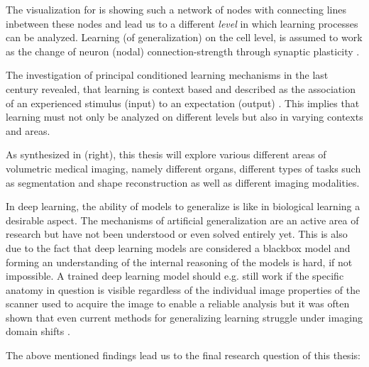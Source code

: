     The visualization for  is showing such a network of nodes with connecting lines inbetween these nodes and lead us to a different \emph{level} in which learning processes can be analyzed.
    Learning (of generalization) on the cell level, is assumed to work as the change of neuron (nodal) connection-strength through synaptic plasticity \citep{do1949organization, martin2000synaptic}.

    The investigation of principal conditioned learning mechanisms in the last century revealed, that learning is context based and described as the association of an experienced stimulus (input) to an expectation (output)
    \citep{pavlov1928conditioned, pavlov2010conditioned, banich2011generalization}. This implies that learning must not only be analyzed on different levels but also in varying contexts and areas.

    As synthesized in  (right),
    this thesis will explore various different areas of volumetric medical imaging, namely different organs, different types of tasks such as segmentation and shape reconstruction as well as different imaging modalities.

    In deep learning, the ability of models to generalize is like in biological learning a desirable aspect.
    The mechanisms of artificial generalization are an active area of research but have not been understood or even solved entirely yet.
    This is also due to the fact that deep learning models are considered a blackbox model and forming an understanding of the internal reasoning of the models is hard, if not impossible.
    A trained deep learning model should e.g. still work if the specific anatomy in question is visible regardless of the individual image properties of the scanner used to acquire the image to enable a reliable analysis but it was often shown that even current methods for generalizing learning struggle under imaging domain shifts \citep{xx}.

    The above mentioned findings lead us to the final research question of this thesis:

